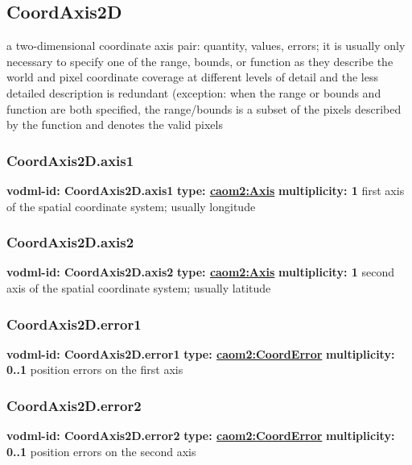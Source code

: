   \subsection{CoordAxis2D}
  \label{sect:CoordAxis2D}
    a two-dimensional coordinate axis pair: quantity, values, errors; it is usually only necessary to specify one of the range, bounds, or function as they describe the world and pixel coordinate coverage at different levels of detail and the less detailed description is redundant (exception: when the range or bounds and function are both specified, the range/bounds is a subset of the pixels described by the function and denotes the valid pixels

    \subsubsection{CoordAxis2D.axis1}
      \textbf{vodml-id: CoordAxis2D.axis1} \newline
      \textbf{type: \hyperref[sect:Axis]{caom2:Axis}} \newline
      \textbf{multiplicity: 1} \newline
      first axis of the spatial coordinate system; usually longitude

    \subsubsection{CoordAxis2D.axis2}
      \textbf{vodml-id: CoordAxis2D.axis2} \newline
      \textbf{type: \hyperref[sect:Axis]{caom2:Axis}} \newline
      \textbf{multiplicity: 1} \newline
      second axis of the spatial coordinate system; usually latitude

    \subsubsection{CoordAxis2D.error1}
      \textbf{vodml-id: CoordAxis2D.error1} \newline
      \textbf{type: \hyperref[sect:CoordError]{caom2:CoordError}} \newline
      \textbf{multiplicity: 0..1} \newline
      position errors on the first axis

    \subsubsection{CoordAxis2D.error2}
      \textbf{vodml-id: CoordAxis2D.error2} \newline
      \textbf{type: \hyperref[sect:CoordError]{caom2:CoordError}} \newline
      \textbf{multiplicity: 0..1} \newline
      position errors on the second axis

